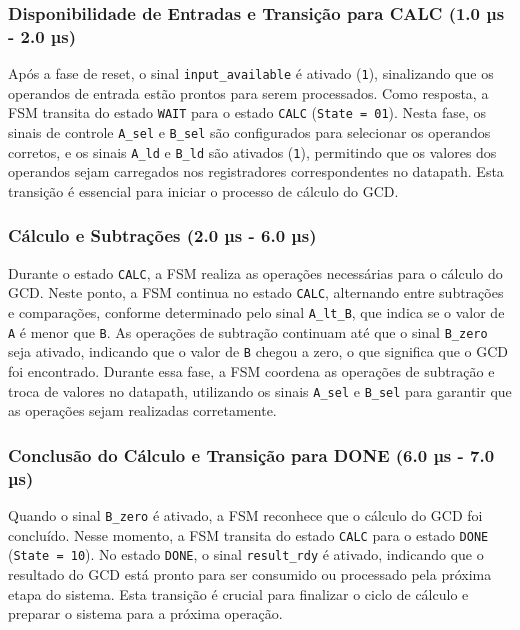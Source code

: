 \documentclass[a4paper,11pt]{article} %
\begin{document}
\subsubsection{Disponibilidade de Entradas e Transição para CALC (1.0 µs - 2.0 µs)}

Após a fase de reset, o sinal \texttt{input\_available} é ativado (\texttt{1}), sinalizando que os operandos de entrada estão prontos para serem processados. Como resposta, a FSM transita do estado \texttt{WAIT} para o estado \texttt{CALC} (\texttt{State = 01}). Nesta fase, os sinais de controle \texttt{A\_sel} e \texttt{B\_sel} são configurados para selecionar os operandos corretos, e os sinais \texttt{A\_ld} e \texttt{B\_ld} são ativados (\texttt{1}), permitindo que os valores dos operandos sejam carregados nos registradores correspondentes no datapath. Esta transição é essencial para iniciar o processo de cálculo do GCD.

\subsubsection{Cálculo e Subtrações (2.0 µs - 6.0 µs)}

Durante o estado \texttt{CALC}, a FSM realiza as operações necessárias para o cálculo do GCD. Neste ponto, a FSM continua no estado \texttt{CALC}, alternando entre subtrações e comparações, conforme determinado pelo sinal \texttt{A\_lt\_B}, que indica se o valor de \texttt{A} é menor que \texttt{B}. As operações de subtração continuam até que o sinal \texttt{B\_zero} seja ativado, indicando que o valor de \texttt{B} chegou a zero, o que significa que o GCD foi encontrado. Durante essa fase, a FSM coordena as operações de subtração e troca de valores no datapath, utilizando os sinais \texttt{A\_sel} e \texttt{B\_sel} para garantir que as operações sejam realizadas corretamente.

\subsubsection{Conclusão do Cálculo e Transição para DONE (6.0 µs - 7.0 µs)}

Quando o sinal \texttt{B\_zero} é ativado, a FSM reconhece que o cálculo do GCD foi concluído. Nesse momento, a FSM transita do estado \texttt{CALC} para o estado \texttt{DONE} (\texttt{State = 10}). No estado \texttt{DONE}, o sinal \texttt{result\_rdy} é ativado, indicando que o resultado do GCD está pronto para ser consumido ou processado pela próxima etapa do sistema. Esta transição é crucial para finalizar o ciclo de cálculo e preparar o sistema para a próxima operação.
\end{document}
